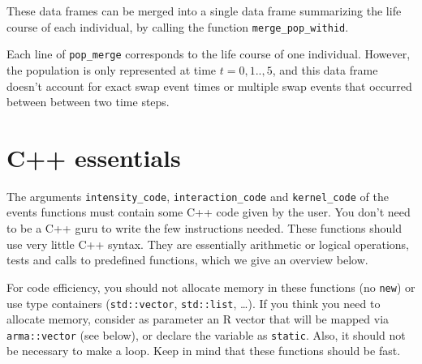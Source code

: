 These data frames can be merged into a single data frame summarizing the life course of each individual, by calling the function \texttt{merge\_pop\_withid}.

\begin{Shaded}
\begin{Highlighting}[]
\OtherTok{\textless{}{-}}\SpecialCharTok{$}
\OtherTok{\textless{}{-}} \NormalTok{)}
\end{Highlighting}
\end{Shaded}

Each line of \texttt{pop\_merge} corresponds to the life course of one individual. However, the population is only represented at time \(t=0,1..,5\), and this data frame doesn't account for exact swap event times or multiple swap events that occurred between between two time steps.

\hypertarget{cppessentials}{%
\section{C++ essentials}\label{cppessentials}}

The arguments \texttt{intensity\_code}, \texttt{interaction\_code} and \texttt{kernel\_code} of the events functions must contain some C++ code given by the user. You don't need to be a C++ guru to write the few instructions needed. These functions should use very little C++ syntax. They are essentially arithmetic or logical operations, tests and calls to predefined functions, which we give an overview below.

For code efficiency, you should not allocate memory in these functions (no \texttt{new}) or use type containers (\texttt{std::vector}, \texttt{std::list}, \ldots). If you think you need to allocate memory, consider as parameter an R vector that will be mapped via \texttt{arma::vector} (see below), or declare the variable as \texttt{static}.
Also, it should not be necessary to make a loop. Keep in mind that these functions should be fast.

